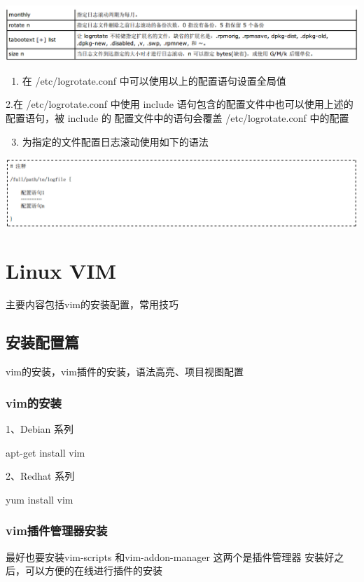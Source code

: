 \documentclass[letterpaper,10pt]{sphinxmanual}
\begin{document}
\includegraphics{logroateconfig2.png}
\begin{enumerate}
\item {} 
在 /etc/logrotate.conf 中可以使用以上的配置语句设置全局值

\end{enumerate}

2.在 /etc/logrotate.conf 中使用 include 语句包含的配置文件中也可以使用上述的配置语句，被 include 的
配置文件中的语句会覆盖 /etc/logrotate.conf 中的配置
\begin{enumerate}
\setcounter{enumi}{2}
\item {} 
为指定的文件配置日志滚动使用如下的语法

\end{enumerate}

\includegraphics{file.png}


\section{Linux VIM}
\label{Linux_vim/index:linux-vim}\label{Linux_vim/index::doc}
主要内容包括vim的安装配置，常用技巧


\subsection{安装配置篇}
\label{Linux_vim/install::doc}\label{Linux_vim/install:id1}
vim的安装，vim插件的安装，语法高亮、项目视图配置


\subsubsection{vim的安装}
\label{Linux_vim/install:vim}
1、Debian 系列

apt-get install vim

2、Redhat 系列

yum install vim


\subsubsection{vim插件管理器安装}
\label{Linux_vim/install:id2}
最好也要安装vim-scripts 和vim-addon-manager 这两个是插件管理器
安装好之后，可以方便的在线进行插件的安装
\end{document}
